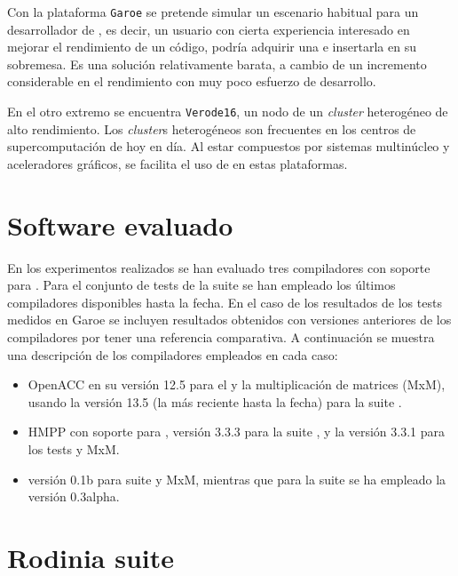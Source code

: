 Con la plataforma \texttt{Garoe} se pretende simular un escenario habitual para un 
desarrollador de \OpenACC{}, es decir, un usuario con cierta experiencia 
interesado en mejorar el rendimiento de un código, podría adquirir una \GPU{} e insertarla
en su sobremesa. Es una solución relativamente barata, a cambio de un incremento
considerable en el rendimiento con muy poco esfuerzo de desarrollo.

En el otro extremo se encuentra \texttt{Verode16}, un nodo de un \textit{cluster}
heterogéneo de alto rendimiento. Los \textit{cluster}s heterogéneos son frecuentes
en los centros de supercomputación de hoy en día. Al estar compuestos por 
sistemas multinúcleo y aceleradores gráficos, se facilita el uso de \OpenACC{} en estas 
plataformas. 

\section{Software evaluado}

En los experimentos realizados se han evaluado tres compiladores con soporte para 
\OpenACC{}. Para el conjunto de tests de la suite \epcc{} \OpenACC{} \benchmark{} se han 
empleado los últimos compiladores disponibles hasta la fecha. En el caso de los resultados 
de los tests \rodinia{} medidos en Garoe se incluyen resultados obtenidos con versiones anteriores de los
compiladores por tener una referencia comparativa.
A continuación se muestra una descripción de los compiladores empleados en cada caso:

\begin{itemize}
\item \PGI{} OpenACC en su versión 12.5 para el \benchmark{} \rodinia{} y la multiplicación de matrices (MxM), usando la versión 13.5 (la más reciente hasta la fecha) para la suite \epcc{} \OpenACC{} \benchmark{}. 
\item \CAPS{} HMPP con soporte para \OpenACC{}, versión 3.3.3 para la suite \epcc{} \OpenACC{}, y la versión 3.3.1 para los tests \rodinia{} y MxM. 
\item \accULL{} versión 0.1b para \rodinia{} \benchmark{} suite y MxM, mientras que  para la suite \epcc{} \OpenACC{} \benchmark{} se ha empleado la versión 0.3alpha.
\end{itemize}

\section{Rodinia \benchmark{} suite}

